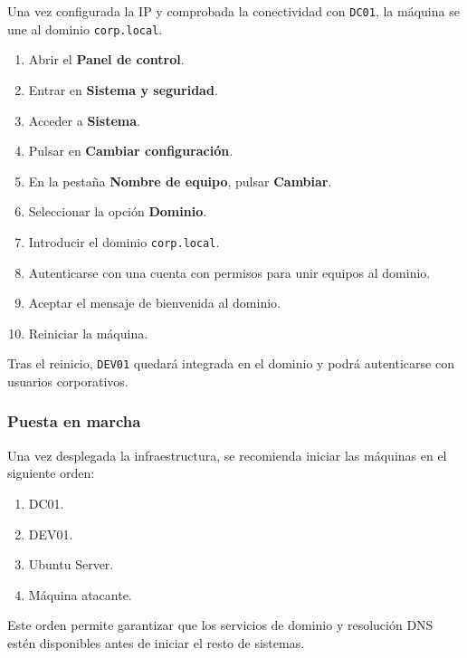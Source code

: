 Una vez configurada la IP y comprobada la conectividad con \texttt{DC01}, la máquina se une al dominio \texttt{corp.local}.

\begin{tcolorbox}[
    enhanced,
    breakable,
    colback=black!3,
    colframe=black!15,
    boxrule=0.2pt,
    arc=2mm,
    left=4mm,
    right=4mm,
    top=2mm,
    bottom=2mm
]
\begin{enumerate}
    \item Abrir el \textbf{Panel de control}.
    \item Entrar en \textbf{Sistema y seguridad}.
    \item Acceder a \textbf{Sistema}.
    \item Pulsar en \textbf{Cambiar configuración}.
    \item En la pestaña \textbf{Nombre de equipo}, pulsar \textbf{Cambiar}.
    \item Seleccionar la opción \textbf{Dominio}.
    \item Introducir el dominio \texttt{corp.local}.
    \item Autenticarse con una cuenta con permisos para unir equipos al dominio.
    \item Aceptar el mensaje de bienvenida al dominio.
    \item Reiniciar la máquina.
\end{enumerate}
\end{tcolorbox}

Tras el reinicio, \texttt{DEV01} quedará integrada en el dominio y podrá autenticarse con usuarios corporativos.

\subsubsection*{Puesta en marcha}

Una vez desplegada la infraestructura, se recomienda iniciar las máquinas en el siguiente orden:

\begin{enumerate}
    \item DC01.
    \item DEV01.
    \item Ubuntu Server.
    \item Máquina atacante.
\end{enumerate}

Este orden permite garantizar que los servicios de dominio y resolución DNS estén disponibles antes de iniciar el resto de sistemas.

